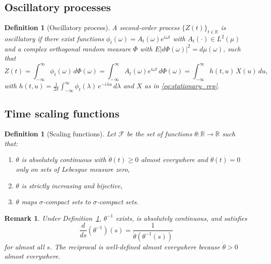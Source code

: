\documentclass{article}
\newtheorem{definition}[theorem]{Definition}
\newtheorem{remark}[theorem]{Remark}
\begin{document}
\subsection{Oscillatory processes}

\begin{definition}[Oscillatory process]\label{def:oscillatory}
A second-order process $\{Z(t)\}_{t\in\mathbb{R}}$ is oscillatory if there exist functions $\phi_t(\omega)=A_t(\omega)e^{i\omega t}$ with $A_t(\cdot)\in L^2(\mu)$ and a complex orthogonal random measure $\Phi$ with $E|d\Phi(\omega)|^2=d\mu(\omega)$, such that
\begin{equation}\label{eq:oscillatory_rep}
Z(t)=\int_{-\infty}^{\infty} \phi_t(\omega)\, d\Phi(\omega)
= \int_{-\infty}^{\infty} A_t(\omega)e^{i\omega t}\, d\Phi(\omega)
= \int_{-\infty}^{\infty} h(t,u)\, X(u)\, du,
\end{equation}
with $h(t,u) = \frac{1}{2\pi}\int_{-\infty}^{\infty} \phi_t(\lambda)\, e^{-i\lambda u}\, d\lambda$ and $X$ as in \eqref{eq:stationary_rep}.
\end{definition}

\subsection{Time scaling functions}

\begin{definition}[Scaling functions]\label{def:scaling}
Let $\mathcal{F}$ be the set of functions $\theta:\mathbb{R}\to\mathbb{R}$ such that:
\begin{enumerate}
\item $\theta$ is absolutely continuous with $\dot{\theta}(t)\ge 0$ almost everywhere and $\dot{\theta}(t)=0$ only on sets of Lebesgue measure zero,
\item $\theta$ is strictly increasing and bijective,
\item $\theta$ maps $\sigma$-compact sets to $\sigma$-compact sets.
\end{enumerate}
\end{definition}

\begin{remark}\label{rem:inverse_properties}
Under Definition~\ref{def:scaling}, $\theta^{-1}$ exists, is absolutely continuous, and satisfies
\[
\frac{d}{ds}(\theta^{-1})(s) = \frac{1}{\dot{\theta}(\theta^{-1}(s))}
\]
for almost all $s$. The reciprocal is well-defined almost everywhere because $\dot{\theta}>0$ almost everywhere.
\end{remark}
\end{document}
